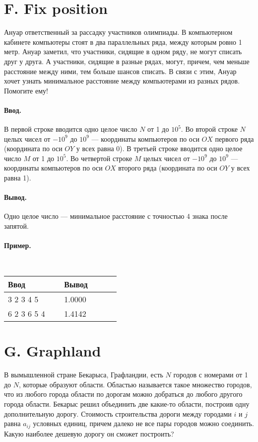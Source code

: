 \documentclass[10pt, a5paper]{article}
\newcommand{\informat}[1]
{
	\paragraph{Ввод.\\} #1
}
\newcommand{\outformat}[1]
{
	\paragraph{Вывод.\\} #1
}
\newcommand{\examplee}[4]
{
	\paragraph{Пример.\\}
	{\tt
	\begin{tabular}{|p{0.4\linewidth}|p{0.4\linewidth}|}
	\hline
	Ввод 	& Вывод  	\\
	\hline
	#1 		& #2 		\\
	\hline
	#3		& #4		\\
	\hline
	\end{tabular}
	}
}
\begin{document}
\section*{F. Fix position}


Ануар ответственный за рассадку участников олимпиады. В компьютерном кабинете компьютеры стоят в два параллельных ряда, между которым ровно 1 метр. Ануар заметил, что участники, сидящие в одном ряду, не могут списать друг у друга. А участники, сидящие в разные рядах, могут, причем, чем меньше расстояние между ними, тем больше шансов списать. В связи с этим, Ануар хочет узнать минимальное расстояние между компьютерами из разных рядов. Помогите ему!

\informat{В первой строке вводится одно целое число $N$ от 1 до $10^5$. \newline 
Во второй строке $N$ целых чисел от $-10^9$ до $10^9$ --- координаты компьютеров по оси $OX$ первого ряда (координата по оси $OY$ у всех равна 0). \newline
В третьей строке вводится одно целое число $M$ от 1 до $10^5$. \newline
Во четвертой строке $M$ целых чисел от $-10^9$ до $10^9$ --- координаты компьютеров по оси $OX$ второго ряда (координата по оси $OY$ у всех равна 1).}

\outformat{Одно целое число --- минимальное расстояние с точностью 4 знака после запятой.}

\examplee
{3 \newline
1 2 3 \newline
3 \newline
3 4 5}
{1.0000}
{6 \newline
1 2 3 6 5 4 \newline
1 \newline
0}
{1.4142}



\section*{G. Graphland}


В вымышленной стране Бекарыса, Графландии, есть $N$ городов с номерами от 1 до $N$, которые образуют области. Областью называется такое множество городов, что из любого города области по дорогам можно добраться до любого другого города области. Бекарыс решил объединить две какие-то области, построив одну дополнительную дорогу. Стоимость строительства дороги между городами $i$ и $j$ равна $a_{ij}$ условных единиц, причем далеко не все пары городов можно соединить. Какую наиболее дешевую дорогу он сможет построить?
\end{document}
